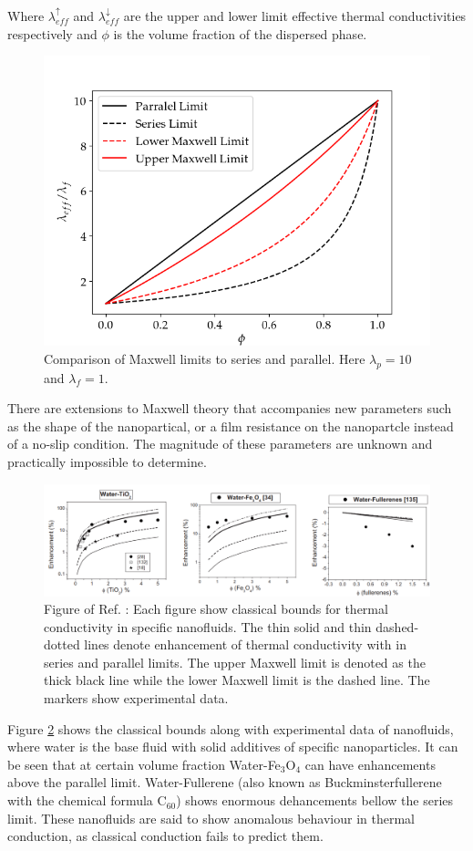 \documentclass[12pt,MEng]{UoAThesis}
\begin{document}
\noindent Where $\lambda^{\uparrow}_{eff}$ and $\lambda^{\downarrow}_{eff}$ are the upper and lower limit effective thermal conductivities respectively and $\phi$ is the volume fraction of the dispersed phase.  

\begin{figure}[htp]
  \centering
  \includegraphics[clip,width=0.62\linewidth]{figures/limits}
  \caption{\label{fig:maxwell} Comparison of Maxwell limits to series and parallel. Here $\lambda_p = 10$ and $\lambda_f = 1$. }
\end{figure}

\noindent There are extensions to Maxwell theory that accompanies new parameters such as the shape of the nanopartical, or a film resistance on the nanopartcle instead of a no-slip condition. The magnitude of these parameters are unknown and practically impossible to determine. 

\begin{figure}[htp]
  \centering
  \includegraphics[clip,width=1\linewidth]{figures/ana}
  \caption{\label{fig:ana} Figure of Ref. \cite{class2010}: Each figure show classical bounds for thermal conductivity in specific nanofluids. The thin solid and thin dashed-dotted lines denote enhancement of thermal conductivity with in series and parallel limits. The upper Maxwell limit is denoted as the thick black line while the lower Maxwell limit is the dashed line. The markers show experimental data.}
\end{figure}

Figure \ref{fig:ana} shows the classical bounds along with experimental data of nanofluids, where water is the base fluid with solid additives of specific nanoparticles. It can be seen that at certain volume fraction Water-Fe$_3$O$_4$ can have enhancements above the parallel limit. Water-Fullerene (also known as Buckminsterfullerene with the chemical formula C$_{60}$) shows enormous dehancements bellow the series limit. These nanofluids are said to show anomalous behaviour in thermal conduction, as classical conduction fails to predict them.
\end{document}
